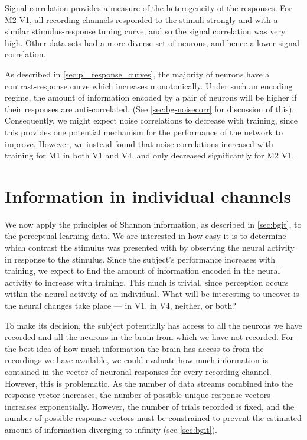 Signal correlation provides a measure of the heterogeneity of the responses.
For \ac{M2} \ac{V1}, all recording channels responded to the stimuli strongly and with a similar stimulus-response tuning curve, and so the signal correlation was very high.
Other data sets had a more diverse set of neurons, and hence a lower signal correlation.

As described in \autoref{sec:pl_response_curves}, the majority of neurons have a contrast-response curve which increases monotonically.
Under such an encoding regime, the amount of information encoded by a pair of neurons will be higher if their responses are anti-correlated.
(See \autoref{sec:bg-noisecorr} for discussion of this).
Consequently, we might expect noise correlations to decrease with training, since this provides one potential mechanism for the performance of the network to improve.
However, we instead found that noise correlations increased with training for \ac{M1} in both \ac{V1} and \ac{V4}, and only decreased significantly for \ac{M2} \ac{V1}.


\section{Information in individual channels}

We now apply the principles of Shannon information, as described in \autoref{sec:bgit}, to the perceptual learning data.
We are interested in how easy it is to determine which contrast the stimulus was presented with by observing the neural activity in response to the stimulus.
Since the subject's performance increases with training, we expect to find the amount of information encoded in the neural activity to increase with training.
This much is trivial, since perception occurs within the neural activity of an individual.
What will be interesting to uncover is  the neural changes take place --- in \ac{V1}, in \ac{V4}, neither, or both?

To make its decision, the subject potentially has access to all the neurons we have recorded and all the neurons in the brain from which we have not recorded.
For the best idea of how much information the brain has access to from the recordings we have available, we could evaluate how much information is contained in the vector of neuronal responses for every recording channel.
However, this is problematic.
As the number of data streams combined into the response vector increases, the number of possible unique response vectors increases exponentially.
However, the number of trials recorded is fixed, and the number of possible response vectors must be constrained to prevent the estimated amount of information diverging to infinity (see \autoref{sec:bgit}).

